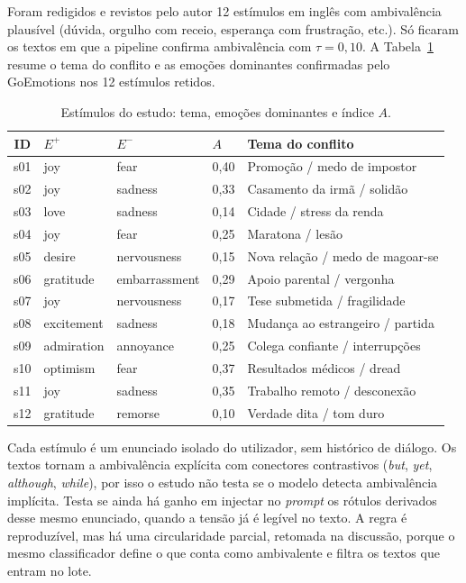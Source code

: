 Foram redigidos e revistos pelo autor 12 estímulos em inglês com ambivalência plausível (dúvida, orgulho com receio, esperança com frustração, etc.). Só ficaram os textos em que a pipeline confirma ambivalência com \(\tau = 0{,}10\). A Tabela~\ref{tab:estimulos} resume o tema do conflito e as emoções dominantes confirmadas pelo GoEmotions nos 12 estímulos retidos.

\begin{table}[ht]
\centering
\caption{Estímulos do estudo: tema, emoções dominantes e índice \(A\).}
\label{tab:estimulos}
\footnotesize
\begin{tabular}{clllp{4.8cm}}
\hline
ID & \(E^+\) & \(E^-\) & \(A\) & Tema do conflito \\
\hline
s01 & joy & fear & 0{,}40 & Promoção / medo de impostor \\
s02 & joy & sadness & 0{,}33 & Casamento da irmã / solidão \\
s03 & love & sadness & 0{,}14 & Cidade / stress da renda \\
s04 & joy & fear & 0{,}25 & Maratona / lesão \\
s05 & desire & nervousness & 0{,}15 & Nova relação / medo de magoar-se \\
s06 & gratitude & embarrassment & 0{,}29 & Apoio parental / vergonha \\
s07 & joy & nervousness & 0{,}17 & Tese submetida / fragilidade \\
s08 & excitement & sadness & 0{,}18 & Mudança ao estrangeiro / partida \\
s09 & admiration & annoyance & 0{,}25 & Colega confiante / interrupções \\
s10 & optimism & fear & 0{,}37 & Resultados médicos / dread \\
s11 & joy & sadness & 0{,}35 & Trabalho remoto / desconexão \\
s12 & gratitude & remorse & 0{,}10 & Verdade dita / tom duro \\
\hline
\end{tabular}
\end{table}

Cada estímulo é um enunciado isolado do utilizador, sem histórico de diálogo. Os textos tornam a ambivalência explícita com conectores contrastivos (\textit{but}, \textit{yet}, \textit{although}, \textit{while}), por isso o estudo não testa se o modelo detecta ambivalência implícita. Testa se ainda há ganho em injectar no \textit{prompt} os rótulos derivados desse mesmo enunciado, quando a tensão já é legível no texto. A regra é reproduzível, mas há uma circularidade parcial, retomada na discussão, porque o mesmo classificador define o que conta como ambivalente e filtra os textos que entram no lote.

